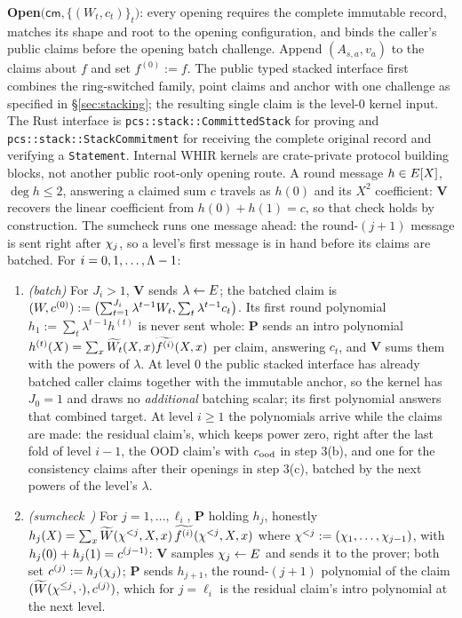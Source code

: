 \begin{protocol}
\smallskip
\textbf{Open}$\bigl(\mathsf{cm},\{(W_t,c_t)\}_t\bigr)$: every opening requires the complete immutable record, matches its shape and root to the opening configuration, and binds the caller's public claims before the opening batch challenge. Append $(A_{s,a},v_a)$ to the claims about $f$ and set $f^{(0)}:=f$. The public typed stacked interface first combines the ring-switched family, point claims and anchor with one challenge as specified in \S\ref{sec:stacking}; the resulting single claim is the level-$0$ kernel input. The Rust interface is \texttt{pcs::stack::CommittedStack} for proving and \texttt{pcs::stack::StackCommitment} for receiving the complete original record and verifying a \texttt{Statement}. Internal WHIR kernels are crate-private protocol building blocks, not another public root-only opening route. A round message $h\in E[X]$, $\deg h\le2$, answering a claimed sum $c$ travels as $h(0)$ and its $X^2$ coefficient: $\mathbf{V}$ recovers the linear coefficient from $h(0)+h(1)=c$, so that check holds by construction. The sumcheck runs one message ahead: the round-$(j+1)$ message is sent right after $\chi_j$, so a level's first message is in hand before its claims are batched. For $i=0,1,\dots,\Lambda-1$:
\begin{enumerate}[itemsep=0.5pt,topsep=2pt]
\item \emph{(batch)} For $J_i>1$, $\mathbf{V}$ sends $\lambda\leftarrow E$; the batched claim is $(W,c^{(0)}):=\bigl(\sum_{t=1}^{J_i}\lambda^{t-1}W_t,\sum_t\lambda^{t-1}c_t\bigr)$. Its first round polynomial $h_1:=\sum_t\lambda^{t-1}h^{(t)}$ is never sent whole: $\mathbf{P}$ sends an intro polynomial $h^{(t)}(X)=\sum_x\widetilde{W_t}(X,x)\widetilde{f^{(i)}}(X,x)$ per claim, answering $c_t$, and $\mathbf{V}$ sums them with the powers of $\lambda$. At level $0$ the public stacked interface has already batched caller claims together with the immutable anchor, so the kernel has $J_0=1$ and draws no \emph{additional} batching scalar; its first polynomial answers that combined target. At level $i\ge1$ the polynomials arrive while the claims are made: the residual claim's, which keeps power zero, right after the last fold of level $i-1$, the OOD claim's with $c_{\mathrm{ood}}$ in step 3(b), and one for the consistency claims after their openings in step 3(c), batched by the next powers of the level's $\lambda$.
\item \emph{(sumcheck~\cite{LFKN92})} For $j = 1, \dots, \ell_i$, $\mathbf{P}$ holding $h_j$, honestly $h_j(X) = \sum_{x} \widetilde{W}(\chi^{<j}, X, x)\, \widetilde{f^{(i)}}(\chi^{<j}, X, x)$ where $\chi^{<j} := (\chi_1, \dots, \chi_{j-1})$, with $h_j(0) + h_j(1) = c^{(j-1)}$: $\mathbf{V}$ samples $\chi_j \leftarrow E$ and sends it to the prover; both set $c^{(j)} := h_j(\chi_j)$; $\mathbf{P}$ sends $h_{j+1}$, the round-$(j{+}1)$ polynomial of the claim $(\widetilde{W}(\chi^{\le j}, \cdot), c^{(j)})$, which for $j = \ell_i$ is the residual claim's intro polynomial at the next level.\\

\end{enumerate}
\end{protocol}
